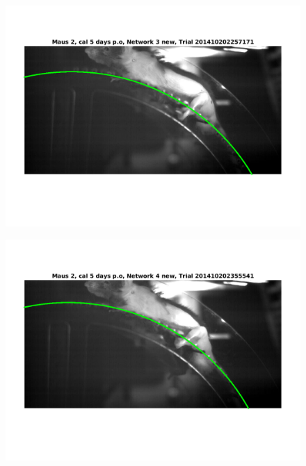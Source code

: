 \documentclass[
	fontsize=12pt,
	paper=a4,
	twoside=false,
	numbers=noenddot,
	plainheadsepline,
	toc=listof,
	toc=bibliography
]{scrartcl}
\begin{document}
\begin{figure} [hb] \centering
	\includegraphics[scale = 0.6]{images/mouse2/result_Maus_2_cal_5_days_Network_3_new.png}
\end{figure}
\begin{figure} [htb] \centering
	\includegraphics[scale = 0.6]{images/mouse2/result_Maus_2_cal_5_days_Network_4_new.png}
\end{figure}


\end{document}
